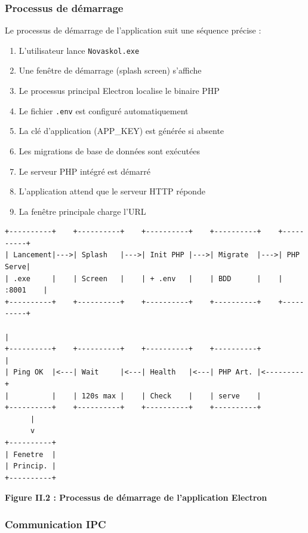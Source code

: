 \documentclass[12pt,a4paper,twoside]{report}
\begin{document}
\subsubsection{Processus de démarrage}

Le processus de démarrage de l'application suit une séquence précise :
\begin{enumerate}
    \item L'utilisateur lance \texttt{Novaskol.exe}
    \item Une fenêtre de démarrage (splash screen) s'affiche
    \item Le processus principal Electron localise le binaire PHP
    \item Le fichier \texttt{.env} est configuré automatiquement
    \item La clé d'application (APP\_KEY) est générée si absente
    \item Les migrations de base de données sont exécutées
    \item Le serveur PHP intégré est démarré
    \item L'application attend que le serveur HTTP réponde
    \item La fenêtre principale charge l'URL
\end{enumerate}

\begin{verbatim}
+----------+    +----------+    +----------+    +----------+    +----------+
| Lancement|--->| Splash   |--->| Init PHP |--->| Migrate  |--->| PHP Serve|
| .exe     |    | Screen   |    | + .env   |    | BDD      |    | :8001    |
+----------+    +----------+    +----------+    +----------+    +----------+
                                                                      |
+----------+    +----------+    +----------+    +----------+          |
| Ping OK  |<---| Wait     |<---| Health   |<---| PHP Art. |<---------+
|          |    | 120s max |    | Check    |    | serve    |
+----------+    +----------+    +----------+    +----------+
      |
      v
+----------+
| Fenetre  |
| Princip. |
+----------+
\end{verbatim}

\begin{center}
\textbf{Figure II.2 : Processus de démarrage de l'application Electron}
\end{center}

\subsubsection{Communication IPC}
\end{document}
